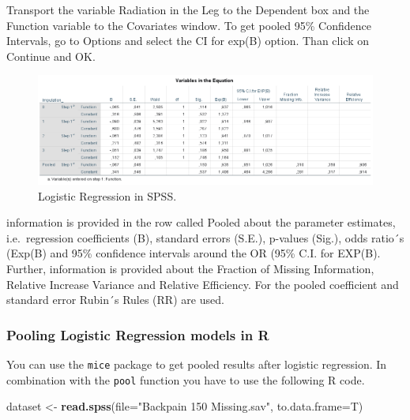 \documentclass[
]{book}
\newenvironment{Shaded}{\begin{snugshade}}{\end{snugshade}}
\newcommand{\DataTypeTok}[1]{\textcolor[rgb]{0.13,0.29,0.53}{#1}}
\newcommand{\KeywordTok}[1]{\textcolor[rgb]{0.13,0.29,0.53}{\textbf{#1}}}
\newcommand{\NormalTok}[1]{#1}
\newcommand{\StringTok}[1]{\textcolor[rgb]{0.31,0.60,0.02}{#1}}
\begin{document}
Transport the variable Radiation in the Leg to the Dependent box and the
Function variable to the Covariates window. To get pooled 95\%
Confidence Intervals, go to Options and select the CI for exp(B) option.
Than click on Continue and OK.

\begin{figure}

{\centering \includegraphics[width=0.9\linewidth]{images/table5.9} 

}

\caption{Logistic Regression in SPSS.}\label{fig:tab5-9}
\end{figure}

information is provided in the row called Pooled about the parameter
estimates, i.e.~regression coefficients (B), standard errors (S.E.),
p-values (Sig.), odds ratio´s (Exp(B) and 95\% confidence intervals
around the OR (95\% C.I. for EXP(B). Further, information is provided
about the Fraction of Missing Information, Relative Increase Variance
and Relative Efficiency. For the pooled coefficient and standard error
Rubin´s Rules (RR) are used.

\hypertarget{pooling-logistic-regression-models-in-r}{%
\subsubsection{Pooling Logistic Regression models in
R}\label{pooling-logistic-regression-models-in-r}}

You can use the \texttt{mice} package to get pooled results after
logistic regression. In combination with the \texttt{pool} function you
have to use the following R code.

\begin{Shaded}
\begin{Highlighting}[]
\NormalTok{dataset <-}\StringTok{ }\KeywordTok{read.spss}\NormalTok{(}\DataTypeTok{file=}\StringTok{"Backpain 150 Missing.sav"}\NormalTok{, }\DataTypeTok{to.data.frame=}\NormalTok{T)}
\end{Highlighting}
\end{Shaded}
\end{document}
